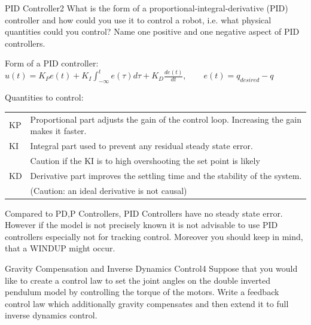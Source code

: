 \begin{questions}
	
	
	\begin{question}{PID Controller}{2}
		What is the form of a proportional-integral-derivative (PID) controller and how could you use it to control a robot, i.e. what physical quantities could you control? Name one positive and one negative aspect of PID controllers.
		
\begin{answer}
	     Form of a PID controller: $u(t)=K_P e(t)+K_I \int_{- \infty}^{t} e(\tau)d\tau +K_D \frac{de(t)}{dt}, \qquad e(t) = q_{desired}-q$
	     
	     Quantities to control: \\
	     \begin{tabular}{l l}
	     	KP & Proportional part adjusts the gain of the control loop. Increasing the gain makes it faster. \\
	     	KI & Integral part used to prevent any residual steady state error.\\ &Caution if the KI is to high overshooting the set point is likely \\
	     	KD & Derivative part improves the settling time and the stability of the system.\\& (Caution: an ideal derivative is not causal)\\
	     \end{tabular}
	     
	     Compared to PD,P Controllers, PID Controllers have no steady state error. However if the model is not precisely known it is not advisable to use PID controllers especially not for tracking control. Moreover you should keep in mind, that a WINDUP might occur. 
	     
	\end{answer}
		
	\end{question}
	
		
	\begin{question}{Gravity Compensation and Inverse Dynamics Control}{4}
		Suppose that you would like to create a control law to set the joint angles on the double inverted pendulum model by controlling the torque of the motors. Write a feedback control law which additionally gravity compensates and then extend it to full inverse dynamics control. 
		

\end{question}
\end{questions}
